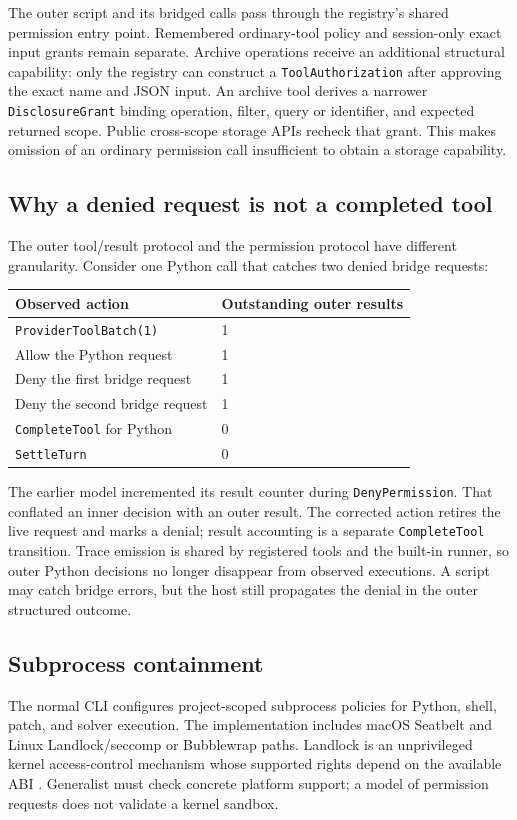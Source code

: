 \documentclass[10pt,letterpaper]{article}
\newcommand{\code}[1]{\texttt{#1}}
\begin{document}
The outer script and its bridged calls pass through the registry's shared
permission entry point. Remembered ordinary-tool policy and session-only exact
input grants remain separate. Archive operations receive an additional
structural capability: only the registry can construct a
\code{ToolAuthorization} after approving the exact name and JSON input. An
archive tool derives a narrower \code{DisclosureGrant} binding operation,
filter, query or identifier, and expected returned scope. Public cross-scope
storage APIs recheck that grant. This makes omission of an ordinary permission
call insufficient to obtain a storage capability.

\subsection{Why a denied request is not a completed tool}
The outer tool/result protocol and the permission protocol have different
granularity. Consider one Python call that catches two denied bridge requests:
\begin{center}
\small
\begin{tabular}{@{}ll@{}}
\toprule
Observed action & Outstanding outer results \\
\midrule
\code{ProviderToolBatch(1)} & 1 \\
Allow the Python request & 1 \\
Deny the first bridge request & 1 \\
Deny the second bridge request & 1 \\
\code{CompleteTool} for Python & 0 \\
\code{SettleTurn} & 0 \\
\bottomrule
\end{tabular}
\end{center}
The earlier model incremented its result counter during \code{DenyPermission}.
That conflated an inner decision with an outer result. The corrected action
retires the live request and marks a denial; result accounting is a separate
\code{CompleteTool} transition. Trace emission is shared by registered tools
and the built-in runner, so outer Python decisions no longer disappear from
observed executions. A script may catch bridge errors, but the host still
propagates the denial in the outer structured outcome.

\subsection{Subprocess containment}
The normal CLI configures project-scoped subprocess policies for Python, shell,
patch, and solver execution. The implementation includes macOS Seatbelt and
Linux Landlock/seccomp or Bubblewrap paths. Landlock is an unprivileged kernel
access-control mechanism whose supported rights depend on the available ABI
\cite{landlock}. Generalist must check concrete platform support; a model of
permission requests does not validate a kernel sandbox.
\end{document}
